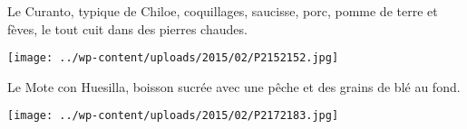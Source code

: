 \pagebreak
 Le Curanto, typique de Chiloe, coquillages, saucisse, porc, pomme de terre et fèves, le tout cuit dans des pierres chaudes.
 \begin{center} \texttt{[image: ../wp-content/uploads/2015/02/P2152152.jpg]} \end{center}

 Le Mote con Huesilla, boisson sucrée avec une pêche et des grains de blé au fond.
\begin{center} \texttt{[image: ../wp-content/uploads/2015/02/P2172183.jpg]} \end{center}
